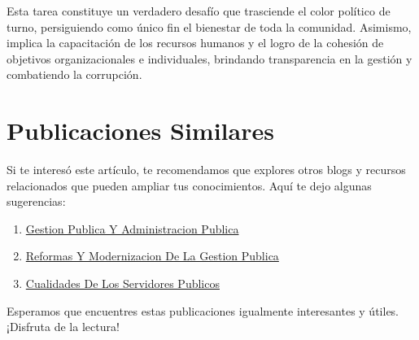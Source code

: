 \documentclass[
  jou,
  floatsintext,
  longtable,
  a4paper,
  nolmodern,
  notxfonts,
  notimes,
  12pt,
  colorlinks=true,linkcolor=blue,citecolor=blue,urlcolor=blue]{apa7}
\providecommand{\tightlist}{%
  \setlength{\itemsep}{0pt}\setlength{\parskip}{0pt}}
\begin{document}
Esta tarea constituye un verdadero desafío que trasciende el color
político de turno, persiguiendo como único fin el bienestar de toda la
comunidad. Asimismo, implica la capacitación de los recursos humanos y
el logro de la cohesión de objetivos organizacionales e individuales,
brindando transparencia en la gestión y combatiendo la corrupción.

\section{Publicaciones Similares}\label{publicaciones-similares}

Si te interesó este artículo, te recomendamos que explores otros blogs y
recursos relacionados que pueden ampliar tus conocimientos. Aquí te dejo
algunas sugerencias:

\begin{enumerate}
\def\labelenumi{\arabic{enumi}.}
\tightlist
\item
  \href{https://res-publica.netlify.app/posts/2021-10-01-gestion-publica-y-administracion-publica/index.pdf}{}
  \href{https://res-publica.netlify.app/posts/2021-10-01-gestion-publica-y-administracion-publica}{Gestion
  Publica Y Administracion Publica}
\item
  \href{https://res-publica.netlify.app/posts/2021-10-01-reformas-y-modernizacion-de-la-gestion-publica/index.pdf}{}
  \href{https://res-publica.netlify.app/posts/2021-10-01-reformas-y-modernizacion-de-la-gestion-publica}{Reformas
  Y Modernizacion De La Gestion Publica}
\item
  \href{https://res-publica.netlify.app/posts/2023-05-11-cualidades-de-los-servidores-publicos/index.pdf}{}
  \href{https://res-publica.netlify.app/posts/2023-05-11-cualidades-de-los-servidores-publicos}{Cualidades
  De Los Servidores Publicos}
\end{enumerate}

Esperamos que encuentres estas publicaciones igualmente interesantes y
útiles. ¡Disfruta de la lectura!
\end{document}
